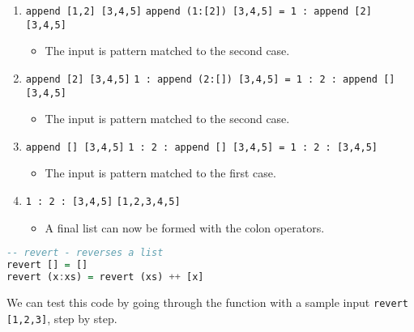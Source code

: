 \documentclass{article}
\theoremstyle{theorem}
\theoremstyle{definition}
\theoremstyle{remark}
\begin{document}
\begin{enumerate}[noitemsep]
    \item \texttt{append [1,2] [3,4,5]}
    \linebreak \texttt{append (1:[2]) [3,4,5] = 1 : append [2] [3,4,5]}
    \begin{itemize}
        \item The input is pattern matched to the second case.
    \end{itemize} 
    \item \texttt{append [2] [3,4,5]}
    \linebreak \texttt{1 : append (2:[]) [3,4,5] = 1 : 2 : append [] [3,4,5]}
    \begin{itemize}
        \item The input is pattern matched to the second case.
    \end{itemize}
    \item \texttt{append [] [3,4,5]}
    \linebreak \texttt{1 : 2 : append [] [3,4,5] = 1 : 2 : [3,4,5]}
    \begin{itemize}
        \item The input is pattern matched to the first case.
    \end{itemize}
    \item \texttt{1 : 2 : [3,4,5]}
    \linebreak \texttt{[1,2,3,4,5]}
    \begin{itemize}
        \item A final list can now be formed with the colon operators.
    \end{itemize}
\end{enumerate}

\newpage %

\begin{lstlisting}[language=Haskell]
-- revert - reverses a list
revert [] = []
revert (x:xs) = revert (xs) ++ [x]
\end{lstlisting}
    
\noindent We can test this code by going through the function with a sample input \texttt{revert [1,2,3]}, step by step.
\end{document}

